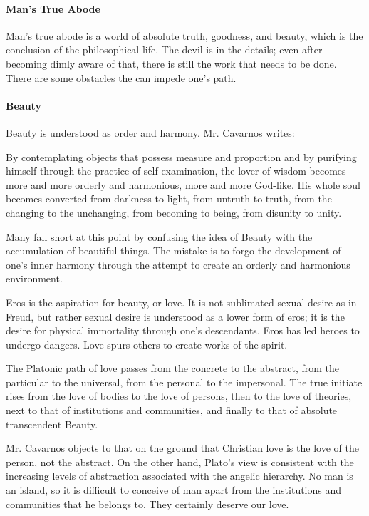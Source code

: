 \paragraph{Man's True Abode}
Man's true abode is a world of absolute truth, goodness, and beauty, which is the conclusion of the philosophical life. The devil is in the details; even after becoming dimly aware of that, there is still the work that needs to be done. There are some obstacles the can impede one's path.

\paragraph{Beauty}
Beauty is understood as order and harmony. Mr. Cavarnos writes:

\begin{quotex}
By contemplating objects that possess measure and proportion and by purifying himself through the practice of self-examination, the lover of wisdom becomes more and more orderly and harmonious, more and more God-like. His whole soul becomes converted from darkness to light, from untruth to truth, from the changing to the unchanging, from becoming to being, from disunity to unity. 

\end{quotex}
Many fall short at this point by confusing the idea of Beauty with the accumulation of beautiful things. The mistake is to forgo the development of one's inner harmony through the attempt to create an orderly and harmonious environment.

Eros is the aspiration for beauty, or love. It is not sublimated sexual desire as in Freud, but rather sexual desire is understood as a lower form of eros; it is the desire for physical immortality through one's descendants. Eros has led heroes to undergo dangers. Love spurs others to create works of the spirit.

The Platonic path of love passes from the concrete to the abstract, from the particular to the universal, from the personal to the impersonal. The true initiate rises from the love of bodies to the love of persons, then to the love of theories, next to that of institutions and communities, and finally to that of absolute transcendent Beauty.

Mr. Cavarnos objects to that on the ground that Christian love is the love of the person, not the abstract. On the other hand, Plato's view is consistent with the increasing levels of abstraction associated with the angelic hierarchy. No man is an island, so it is difficult to conceive of man apart from the institutions and communities that he belongs to. They certainly deserve our love.


